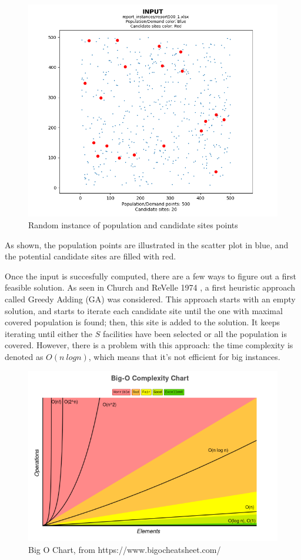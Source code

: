 \documentclass[11pt, a4paper]{article}
\begin{document}
\begin{figure}[h]
	\centering
	\includegraphics[scale=0.8]{example_instance_input.png}
	\caption{Random instance of population and candidate sites points}
	\label{fig:example_instance_input}
\end{figure}

As shown, the population points are illustrated in the scatter plot in blue, and the potential candidate sites are filled with red.

Once the input is succesfully computed, there are a few ways to figure out a first feasible solution. As seen in Church and ReVelle 1974 \cite{church1974}, a first heuristic approach called Greedy Adding (GA) was considered. This approach starts with an empty solution, and starts to iterate each candidate site until the one with maximal covered population is found; then, this site is added to the solution. It keeps iterating until either the $S$ facilities have been selected or all the population is covered. However, there is a problem with this approach: the time complexity is denoted as $O(n \ logn)$, which means that it's not efficient for big instances.

\begin{figure}
	\centering
	\includegraphics[scale=0.4]
	{bigochart.png}
	\caption{Big O Chart, from https://www.bigocheatsheet.com/}
	\label{bigochart}
\end{figure}
\end{document}
